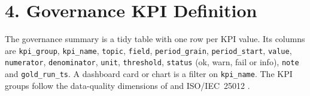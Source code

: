 \documentclass[stu, 12pt, letterpaper, donotrepeattitle, floatsintext, natbib]{apa7}
\begin{document}
\section{\large 4. Governance KPI Definition}
The governance summary is a tidy table with one row per KPI value. Its columns are \texttt{kpi\_group}, \texttt{kpi\_name}, \texttt{topic}, \texttt{field}, \texttt{period\_grain}, \texttt{period\_start}, \texttt{value}, \texttt{numerator}, \texttt{denominator}, \texttt{unit}, \texttt{threshold}, \texttt{status} (ok, warn, fail or info), \texttt{note} and \texttt{gold\_run\_ts}. A dashboard card or chart is a filter on \texttt{kpi\_name}. The KPI groups follow the data-quality dimensions of \citet{wang1996} and ISO/IEC~25012 \citep{iso25012}.
\end{document}
